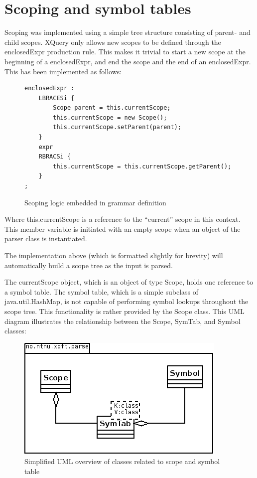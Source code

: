 \section{Scoping and symbol tables}
Scoping was implemented using a simple tree structure consisting of parent- and
child scopes. XQuery only allows new scopes to be defined through the
enclosedExpr production rule. This makes it trivial to start a new scope at the
beginning of a enclosedExpr, and end the scope and the end of an enclosedExpr.
This has been implemented as follows:
\begin{figure}[!h]
\begin{verbatim}
enclosedExpr : 
    LBRACESi {
        Scope parent = this.currentScope; 
        this.currentScope = new Scope(); 
        this.currentScope.setParent(parent); 
    }
    expr 
    RBRACSi { 
        this.currentScope = this.currentScope.getParent(); 
    }
;
\end{verbatim}
\caption{Scoping logic embedded in grammar definition}
\end{figure}

Where this.currentScope is a reference to the ``current'' scope in this
context. This member variable is initiated with an empty scope when an object
of the parser class is instantiated.

The implementation above (which is formatted slightly for brevity) will
automatically build a scope tree as the input is parsed.

The currentScope object, which is an object of type Scope, holds one reference
to a symbol table. The symbol table, which is a simple subclass of
java.util.HashMap, is not capable of performing symbol lookups throughout the
scope tree. This functionality is rather provided by the Scope class. This UML diagram
illustrates the relationship between the Scope, SymTab, and Symbol classes:
\clearpage
\begin{figure}[!h]
  \centering
    \includegraphics[scale=0.8]{img/uml1}
  \caption{Simplified UML overview of classes related to scope and symbol table}
\end{figure}

